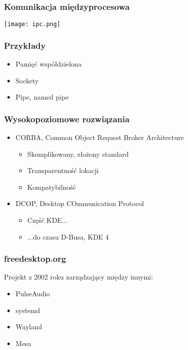 

\begin{frame}
\frametitle{Komunikacja międzyprocesowa}
\texttt{[image: ipc.png]}
\end{frame}

\begin{frame}
    \frametitle{Przykłady}
        \begin{itemize}
        \item Pamięć współdzielona
        \item Sockety
        \item Pipe, named pipe
    \end{itemize}
\end{frame}

\begin{frame}
    \frametitle{Wysokopoziomowe rozwiązania}
    \begin{itemize}
        \item CORBA, Common Object Request Broker Architecture
        \begin{itemize}
            \item Skomplikowany, złożony standard
            \item Transparentność lokacji
            \item Kompatybilność
        \end{itemize}
        \item DCOP, Desktop COmmunication Protocol
        \begin{itemize}
            \item Część KDE...
            \item ...do czasu D-Busa, KDE 4
        \end{itemize}
    \end{itemize}

\end{frame}


\begin{frame}
    \frametitle{freedesktop.org}
    Projekt z 2002 roku zarządzający między innymi:
    \begin{itemize}
        \item PulseAudio
        \item systemd
        \item Wayland
        \item Mesa
    \end{itemize}

\end{frame}
    


